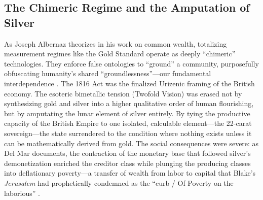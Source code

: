 \documentclass[
]{article}
\begin{document}
\subsection{The Chimeric Regime and the Amputation of
Silver}\label{the-chimeric-regime-and-the-amputation-of-silver}

As Joseph Albernaz theorizes in his work on common wealth, totalizing
measurement regimes like the Gold Standard operate as deeply
``chimeric'' technologies. They enforce false ontologies to ``ground'' a
community, purposefully obfuscating humanity's shared
``groundlessness''---our fundamental interdependence
\citep{albernaz2024common}. The 1816 Act was the finalized Urizenic
framing of the British economy. The esoteric bimetallic tension (Twofold
Vision) was erased not by synthesizing gold and silver into a higher
qualitative order of human flourishing, but by amputating the lunar
element of silver entirely. By tying the productive capacity of the
British Empire to one isolated, calculable element---the 22-carat
sovereign---the state surrendered to the condition where nothing exists
unless it can be mathematically derived from gold. The social
consequences were severe: as Del Mar documents, the contraction of the
monetary base that followed silver's demonetization enriched the
creditor class while plunging the producing classes into deflationary
poverty---a transfer of wealth from labor to capital that Blake's
\emph{Jerusalem} had prophetically condemned as the ``curb / Of Poverty
on the laborious'' \citep{delmar1895history, erdman1988complete}.
\end{document}
